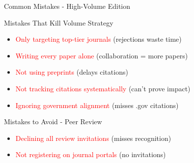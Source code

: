 \documentclass[11pt]{beamer}
\begin{document}
	\begin{frame}{Common Mistakes - High-Volume Edition}
		\scriptsize
		\begin{block}{Mistakes That Kill Volume Strategy}
			\begin{itemize}
				\item \textcolor{red}{Only targeting top-tier journals} (rejections waste time)
				\item \textcolor{red}{Writing every paper alone} (collaboration = more papers)
				\item \textcolor{red}{Not using preprints} (delays citations)
				\item \textcolor{red}{Not tracking citations systematically} (can't prove impact)
				\item \textcolor{red}{Ignoring government alignment} (misses .gov citations)
			\end{itemize}
		\end{block}
		\begin{block}{Mistakes to Avoid - Peer Review}
			\begin{itemize}
				\item \textcolor{red}{Declining all review invitations} (misses recognition)
				\item \textcolor{red}{Not registering on journal portals} (no invitations)
			\end{itemize}
		\end{block}
	\end{frame}
	
\end{document}
